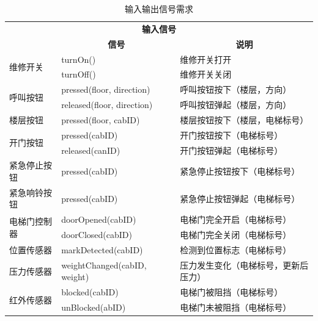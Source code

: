 \begin{center}
\begin{longtable}{l l l}
	\caption{输入输出信号需求}\\

	\toprule
	\multicolumn{3}{c}{\textbf{输入信号}} \\
	\hdashline
	\multicolumn{1}{c}{\textbf{组件}} &
	\multicolumn{1}{c}{\textbf{信号}} &
	\multicolumn{1}{c}{\textbf{说明}} \\ \cmidrule(lr){1-1} \cmidrule(lr){2-2} \cmidrule(lr){3-3}

	\multirow{2}{*}{维修开关}
	& turnOn() & 维修开关打开\\
	& turnOff() & 维修开关关闭\\ \cmidrule(lr){1-3}

	\multirow{2}{*}{呼叫按钮}
	& pressed(floor, direction) & 呼叫按钮按下（楼层，方向）\\
	& released(floor, direction) & 呼叫按钮弹起（楼层，方向）\\ \cmidrule(lr){1-3}

	楼层按钮
	& pressed(floor, cabID) & 楼层按钮按下（楼层，电梯标号）\\ \cmidrule(lr){1-3}

	\multirow{2}{*}{开门按钮}
	& pressed(cabID) & 开门按钮按下（电梯标号）\\
	& released(canID) & 开门按钮弹起（电梯标号）\\ \cmidrule(lr){1-3}

	紧急停止按钮
	& pressed(cabID) & 紧急停止按钮按下（电梯标号）\\ \cmidrule(lr){1-3}

	紧急响铃按钮
	& pressed(cabID) & 紧急停止按钮弹起（电梯标号）\\ \cmidrule(lr){1-3}

	\multirow{2}{*}{电梯门控制器}
	& doorOpened(cabID) & 电梯门完全开启（电梯标号）\\
	& doorClosed(cabID) & 电梯门完全关闭（电梯标号） \\ \cmidrule(lr){1-3}

	位置传感器
	& markDetected(cabID) & 检测到位置标志（电梯标号）\\ \cmidrule(lr){1-3}

	压力传感器
	& weightChanged(cabID, weight) & 压力发生变化（电梯标号，更新后压力）\\ \cmidrule(lr){1-3}

	\multirow{2}{*}{红外传感器}
	& blocked(cabID) & 电梯门被阻挡（电梯标号）\\
	& unBlocked(abID) & 电梯门未被阻挡（电梯标号）\\


\end{longtable}
\end{center}
